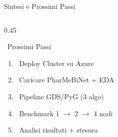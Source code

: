 \documentclass[aspectratio=169]{beamer}
\newcommand{\icoDB}{\faDatabase}
\newcommand{\icoServer}{\faServer}
\newcommand{\icoCode}{\faCode}
\newcommand{\icoRoad}{\faRoad}
\newcommand{\icoChart}{\faChartBar}
\newcommand{\icoGrad}{\faGraduationCap}
\newcommand{\icoDB}{\ding{110}}
\newcommand{\icoServer}{\ding{111}}
\newcommand{\icoCode}{\texttt{</>}}
\newcommand{\icoRoad}{\ding{229}}
\newcommand{\icoChart}{\ding{115}}
\newcommand{\icoGrad}{\ding{72}}
\begin{document}
\begin{frame}{Sintesi e Prossimi Passi}
\begin{columns}[T]
\begin{column}{0.45\textwidth}
\begin{block}{\icoRoad\ Prossimi Passi}
\begin{enumerate}
          \item \icoServer\ Deploy Cluster su Azure
          \item \icoDB\ Caricare PharMeBiNet + EDA
          \item \icoCode\ Pipeline GDS/PyG (3 algo)
          \item \icoChart\ Benchmark 1 $\to$ 2 $\to$ 4 nodi
          \item \icoGrad\ Analisi risultati + stesura
        \end{enumerate}
      \end{block}
    \end{column}
  \end{columns}
\end{frame}
\end{document}
